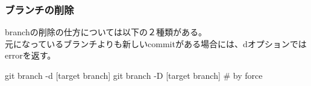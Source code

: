 \documentclass[10pt,a4j,openany,dvipdfmx]{jsarticle}
\begin{document}
\subsubsection{ブランチの削除} %
\label{ssub:ブランチの削除}

branchの削除の仕方については以下の２種類がある。\\
元になっているブランチよりも新しいcommitがある場合には、dオプションではerrorを返す。
\begin{commandshell}
git branch -d [target branch]
git branch -D [target branch]   # by force
\end{commandshell}





\end{document}

